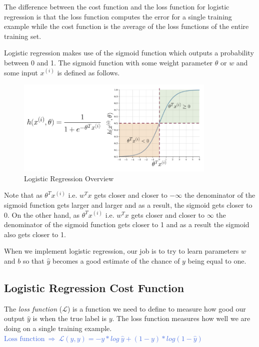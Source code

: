 \documentclass[letterpaper,12pt,notitlepage,twoside]{report}
\begin{document}
\begin{example}
     The difference between the cost function and the loss function for logistic regression is that the loss function computes the error for a single training example while the cost function is the average of the loss functions of the entire training set. 
\end{example}

Logistic regression makes use of the sigmoid function which outputs a probability between 0 and 1. The sigmoid function with some weight parameter $\theta$ or $w$ and some input $x^{(i)}$ is defined as follows. 

\begin{figure}[h]
	\centering
	\includegraphics[width=0.85\textwidth]{Images/Logistic with sigmoid fxn.png}
	\caption{Logistic Regression Overview}
	\label{fig:7}
\end{figure}

Note that as $\theta^T x^{(i)}$ i.e.  $w^Tx$ gets closer and closer to $-\infty$ the denominator of the sigmoid function gets larger and larger and as a result, the sigmoid gets closer to 0.  On the other hand, as $\theta^T x^{(i)}$ i.e.  $w^Tx$ gets closer and closer to $\infty$ the denominator of the sigmoid function gets closer to 1 and as a result the sigmoid also gets closer to 1. 

\begin{example}
    When we implement logistic regression,  our job is to try to learn parameters $w$ and $b$ so that $\hat{y}$ becomes a good estimate of the chance of $y$ being equal to one. 
\end{example}

\subsection*{Logistic Regression Cost Function}
The \emph{loss function} ($\mathcal{L}$) is a function we need to define to measure how good our output $\hat{y}$ is when the true label is $y$. The loss function measures how well we are doing on a single training example. \\
\textcolor{RoyalBlue}{$\text{Loss function}~ \Rightarrow~ \mathcal{L}(\hat{y}, y) = - y*log~\hat{y} + (1 - y)*log(1 - \hat{y})$}
\end{document}
